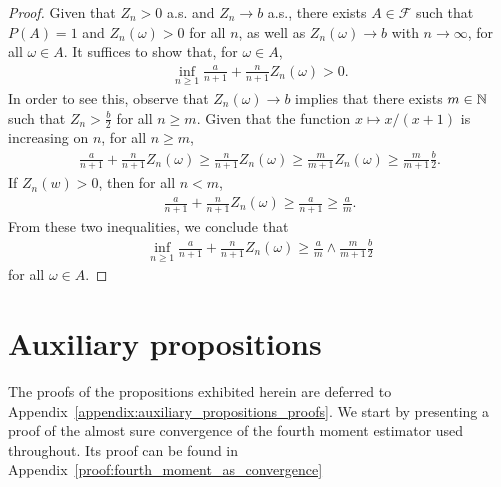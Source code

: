 \begin{proof}
     Given that $Z_n > 0$ a.s. and $Z_n \to b$ a.s., there exists $A \in \mathcal{F}$ such that $P(A) = 1$ and $Z_n(\omega) > 0$ for all $n$, as well as $Z_n(\omega) \to b$ with $n \to \infty$, for all $\omega \in A$. It suffices to show that, for $\omega \in A$, 
    \begin{align*}
        \inf_{n \geq 1} \frac{a}{n + 1} + \frac{n}{n+1} Z_n(\omega) > 0.
    \end{align*}
    In order to see this, observe that $Z_n(\omega) \to b$ implies that there exists $m \in \mathbb{N}$ such that $Z_n > \frac{b}{2}$ for all $n \geq m$. Given that the function $x \mapsto x / (x + 1)$ is increasing on $n$, for all $n \geq m$, 
    \begin{align*}
        \frac{a}{n + 1} + \frac{n}{n+1} Z_n(\omega) \geq \frac{n}{n+1} Z_n(\omega) \geq \frac{m}{m+1} Z_n(\omega) \geq \frac{m}{m+1} \frac{b}{2}.
    \end{align*}
    If $Z_n(w) > 0$, then for all $n < m$, 
    \begin{align*}
        \frac{a}{n + 1} + \frac{n}{n+1} Z_n(\omega) \geq  \frac{a}{n + 1} \geq \frac{a}{m}.
    \end{align*}
    From these two inequalities, we conclude that
    \begin{align*}
        \inf_{n \geq 1} \frac{a}{n + 1} + \frac{n}{n+1} Z_n(\omega) \geq \frac{a}{m} \wedge  \frac{m}{m+1} \frac{b}{2}
    \end{align*}
    for all $\omega \in A$.
\end{proof}





\section{Auxiliary propositions} \label{section:auxiliary_propositions}

The proofs of the propositions exhibited herein are deferred to Appendix~\ref{appendix:auxiliary_propositions_proofs}. We start by presenting a proof of the almost sure convergence of the fourth moment estimator used throughout. Its proof can be found in Appendix~\ref{proof:fourth_moment_as_convergence}


